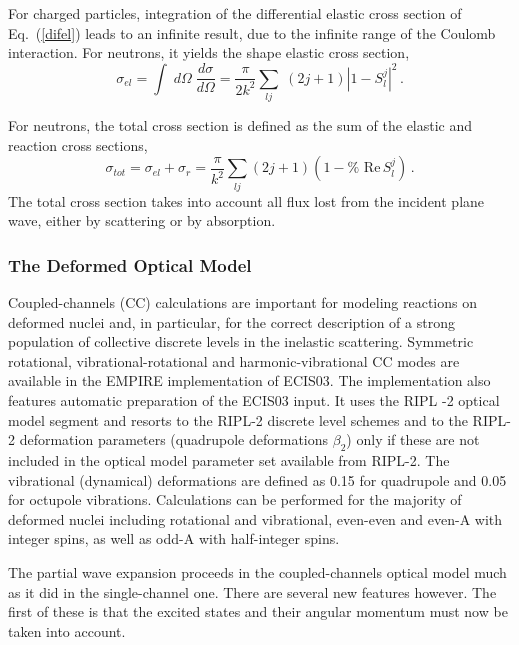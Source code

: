 For charged particles, integration of the differential elastic cross section
of Eq.~(\ref{difel}) leads to an infinite result, due to the infinite range
of the Coulomb interaction. For neutrons, it yields the shape elastic cross
section,
\begin{equation}
\sigma_{el}=\int\; d\Omega\;\frac{d\sigma}{d\Omega}=\frac{\pi}{2k^{2}}%
\sum_{lj}\;(2j+1)\left|1-S_{l}^{j}\right|^{2}\,.
\end{equation}

For neutrons, the total cross section is defined as the sum of the elastic
and reaction cross sections,
\begin{equation}
\sigma_{tot}=\sigma_{el}+\sigma_{r}=\frac{\pi}{k^{2}}\sum_{lj}(2j+1)(1-\text{%
Re}\, S_{l}^{j})\,.
\end{equation}
The total cross section takes into account all flux lost from the incident
plane wave, either by scattering or by absorption.

\subsubsection{The Deformed Optical Model\label{sec:DWBA-CC}}

Coupled-channels (CC) calculations are important for modeling reactions on
deformed nuclei and, in particular, for the correct description of a strong
population of collective discrete levels in the inelastic scattering.
Symmetric rotational, vibrational-rotational and harmonic-vibrational CC
modes are available in the EMPIRE implementation of ECIS03. The
implementation also features automatic preparation of the ECIS03 input. It
uses the RIPL%
-2 \cite{RIPL2} optical model segment and resorts to the RIPL-2
discrete level schemes and to the RIPL-2 deformation parameters (quadrupole
deformations $\beta_{2}$) only if these are not included in the optical
model parameter set available from RIPL-2. The vibrational (dynamical)
deformations are defined as 0.15 for quadrupole and 0.05 for octupole
vibrations. Calculations can be performed for the majority of deformed
nuclei including rotational and vibrational, even-even and even-A with
integer spins, as well as odd-A with half-integer spins.

The partial wave expansion proceeds in the coupled-channels optical model
much as it did in the single-channel one. There are several new features
however. The first of these is that the excited states and their angular
momentum must now be taken into account.

